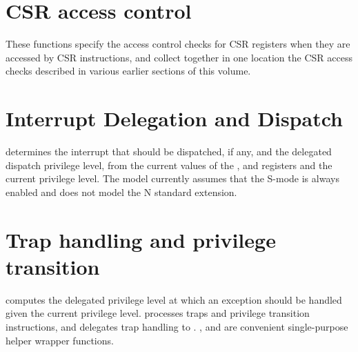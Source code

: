 \section{CSR access control}
\label{s:priv-sail-csr-access}

These functions specify the access control checks for CSR registers
when they are accessed by CSR instructions, and collect together in
one location the CSR access checks described in various earlier
sections of this volume.

\begin{formalspec}
  \sailfncsrAccess
  \sailfncsrPriv
  \sailfnisCSRDefined
  \sailfncheckCSRAccess
  \sailfncheckTVMSATP
  \sailfncheckCounteren
  \sailfncheckCSR
\end{formalspec}

\section{Interrupt Delegation and Dispatch}
\label{s:priv-sail-intrs}

 determines the interrupt that should be
dispatched, if any, and the delegated dispatch privilege level, from
the current values of the ,  and
 registers and the current privilege level.  The
model currently assumes that the S-mode is always enabled and does not
model the N standard extension.

\begin{formalspec}
  \sailfnfindPendingInterrupt
  \sailfndispatchInterrupt
\end{formalspec}

\section{Trap handling and privilege transition}
\label{s:priv-sail-traps}

 computes the delegated privilege
level at which an exception should be handled given the current
privilege level.   processes traps and
privilege transition instructions, and delegates trap handling to
.  ,
 and  are
convenient single-purpose helper wrapper functions.

\begin{formalspec}
  \sailfnexceptionDelegatee
  \sailfnhandleTrap
  \sailfnhandleException
  \sailfnhandleMemException
  \sailfnhandleInterrupt
  \sailfnhandleIllegal
\end{formalspec}

